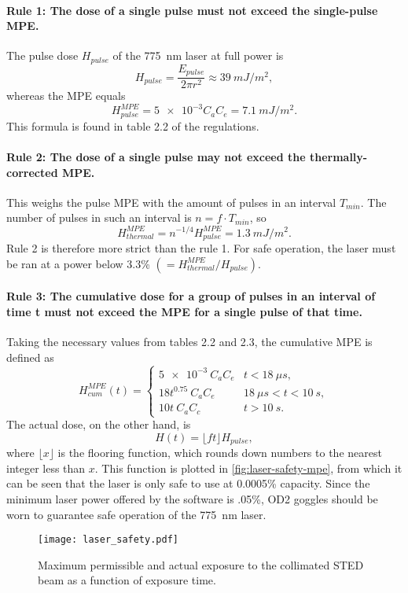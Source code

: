 \paragraph{Rule 1: The dose of a single pulse must not exceed the single-pulse MPE.} The pulse dose $ H_\mathit{pulse} $ of the 775~nm laser at full power is
\begin{equation}
	H_\mathit{pulse} = \frac{E_\mathit{pulse}}{2\pi r^2} \approx \SI{39}{mJ/m^2},
\end{equation}
whereas the MPE equals
\begin{equation}
	H_\mathit{pulse}^\mathit{MPE} = \num{5e-3} C_a C_e = \SI{7.1}{mJ/m^2}.
\end{equation}
This formula is found in table 2.2 of the regulations.

\paragraph{Rule 2: The dose of a single pulse may not exceed the thermally-corrected MPE.} This weighs the pulse MPE with the amount of pulses in an interval $ T_\mathit{min} $. The number of pulses in such an interval is $ n = f\cdot T_\mathit{min} $, so
\begin{equation}
	H_\mathit{thermal}^\mathit{MPE} =  n^{-1/4} H_\mathit{pulse}^\mathit{MPE} = \SI{1.3}{mJ/m^2}.
\end{equation}
Rule 2 is therefore more strict than the rule 1. For safe operation, the laser must be ran at a power below 3.3\% $ (=H^\mathit{MPE}_\mathit{thermal} / H_\mathit{pulse}) $.

\paragraph{Rule 3: The cumulative dose for a group of pulses in an interval of time t must not exceed the MPE for a single pulse of that time.} Taking the necessary values from tables 2.2 and 2.3, the cumulative MPE is defined as
\begin{equation}
	H_\mathit{cum}^\mathit{MPE}(t) = \left\{\begin{array}{rl}
		\num{5e-3} \:C_a C_e &  t<\SI{18}{\mu s,} \\
		18 t^{0.75} \:C_a C_e &  \SI{18}{\mu s} < t < \SI{10}{s}, \\
		10 t\:C_a C_c  &t> \SI{10}{s}.
	\end{array}\right.
\end{equation}
The actual dose, on the other hand, is
\begin{equation}
	H(t) = \lfloor ft \rfloor H_\mathit{pulse},
\end{equation}
where $ \lfloor x \rfloor$ is the flooring function, which rounds down numbers to the nearest integer less than $ x $. This function is plotted in \autoref{fig:laser-safety-mpe}, from which it can be seen that the laser is only safe to use at 0.0005\% capacity. Since the minimum laser power offered by the software is .05\%, OD2 goggles should be worn to guarantee safe operation of the 775~nm laser.

\begin{figure}
	\centering
	\texttt{[image: laser\_safety.pdf]}
	\caption{Maximum permissible  and actual exposure to the collimated STED beam as a function of exposure time.}
	\label{fig:laser-safety-mpe}
\end{figure}